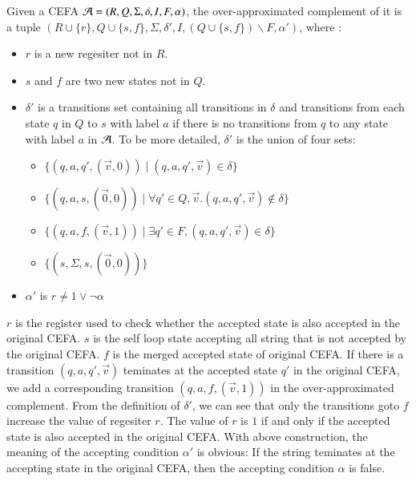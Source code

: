 Given a CEFA $\mathcal{A} = (R, Q, \Sigma, \delta, I, F, \alpha)$, the over-approximated complement of it is a tuple $(R\cup\{r\}, Q\cup\{s,f\}, \Sigma, \delta', I, (Q\cup\{s,f\})\backslash F, \alpha')$, where :
\begin{itemize}
  \item $r$ is a new regesiter not in $R$.
  \item $s$ and $f$ are two new states not in $Q$.
  \item $\delta'$ is a transitions set containing all transitions in $\delta$ and transitions from each state $q$ in $Q$ to $s$ with label $a$ if there is no transitions from $q$ to any state with label $a$ in $\mathcal{A}$. To be more detailed, $\delta'$ is the union of four sets:
  \begin{itemize}
    \item $\{(q, a, q',(\vec{v}, 0)) \mid (q, a, q', \vec{v})\in \delta\}$
    \item $\{(q, a, s,(\vec{0}, 0)) \mid \forall q'\in Q,\vec{v}. (q, a, q', \vec{v})\not\in \delta\}$
    \item $\{(q, a, f,(\vec{v}, 1)) \mid \exists q'\in F, (q, a, q', \vec{v})\in \delta\}$
    \item $\{(s, \Sigma, s, (\vec{0}, 0))\}$
  \end{itemize}
  \item $\alpha'$ is $r \not= 1\vee \neg \alpha$
\end{itemize}

$r$ is the register used to check whether the accepted state is also accepted in the original CEFA. $s$ is the self loop state accepting all string that is not accepted by the original CEFA. $f$ is the merged accepted state of original CEFA. If there is a transition $(q, a, q', \vec{v})$ teminates at the accepted state $q'$ in the original CEFA, we add a corresponding transition $(q, a, f, (\vec{v}, 1))$ in the over-approximated complement. From the definition of $\delta'$, we can see that only the transitions goto $f$ increase the value of regesiter $r$. The value of $r$ is $1$ if and only if the accepted state is also accepted in the original CEFA. With above construction, the meaning of the accepting condition $\alpha'$ is obvious: If the string teminates at the accepting state in the original CEFA, then the accepting condition $\alpha$ is false.

